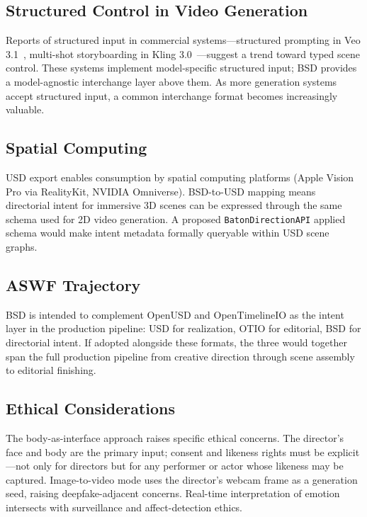 \documentclass{article}
\begin{document}
\subsection{Structured Control in Video Generation}

Reports of structured input in commercial systems---structured prompting in Veo 3.1~\cite{veo31_2025}, multi-shot storyboarding in Kling 3.0~\cite{kling30_2025}---suggest a trend toward typed scene control. These systems implement model-specific structured input; BSD provides a model-agnostic interchange layer above them. As more generation systems accept structured input, a common interchange format becomes increasingly valuable.

\subsection{Spatial Computing}

USD export enables consumption by spatial computing platforms (Apple Vision Pro via RealityKit, NVIDIA Omniverse). BSD-to-USD mapping means directorial intent for immersive 3D scenes can be expressed through the same schema used for 2D video generation. A proposed \texttt{BatonDirectionAPI} applied schema would make intent metadata formally queryable within USD scene graphs.

\subsection{ASWF Trajectory}

BSD is intended to complement OpenUSD and OpenTimelineIO as the intent layer in the production pipeline: USD for realization, OTIO for editorial, BSD for directorial intent. If adopted alongside these formats, the three would together span the full production pipeline from creative direction through scene assembly to editorial finishing.

\subsection{Ethical Considerations}

The body-as-interface approach raises specific ethical concerns. The director's face and body are the primary input; consent and likeness rights must be explicit---not only for directors but for any performer or actor whose likeness may be captured. Image-to-video mode uses the director's webcam frame as a generation seed, raising deepfake-adjacent concerns. Real-time interpretation of emotion intersects with surveillance and affect-detection ethics.
\end{document}

